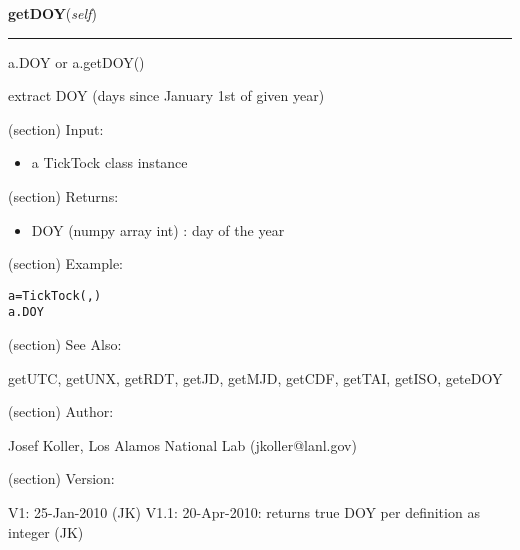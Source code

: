     \label{spacepy:spacetime:TickTock:getDOY}

    \vspace{0.5ex}

\hspace{.8\funcindent}\begin{boxedminipage}{\funcwidth}

    \raggedright \textbf{getDOY}(\textit{self})

    \vspace{-1.5ex}

    \rule{\textwidth}{0.5\fboxrule}
\setlength{\parskip}{2ex}
    a.DOY or a.getDOY()

    extract DOY (days since January 1st of given year)

    (section) Input:

      \begin{itemize}
      \setlength{\parskip}{0.6ex}
        \item a TickTock class instance

      \end{itemize}

    (section) Returns:

      \begin{itemize}
      \setlength{\parskip}{0.6ex}
        \item DOY (numpy array int) : day of the year

      \end{itemize}

    (section) Example:

\begin{alltt}
\pysrcprompt{{\textgreater}{\textgreater}{\textgreater} }a = TickTock(, )
\pysrcprompt{{\textgreater}{\textgreater}{\textgreater} }a.DOY
\end{alltt}
    (section) See Also:

      getUTC, getUNX, getRDT, getJD, getMJD, getCDF, getTAI, getISO, 
      geteDOY

    (section) Author:

      Josef Koller, Los Alamos National Lab (jkoller@lanl.gov)

    (section) Version:

      V1: 25-Jan-2010 (JK) V1.1: 20-Apr-2010: returns true DOY per 
      definition as integer (JK)

\setlength{\parskip}{1ex}
    \end{boxedminipage}

